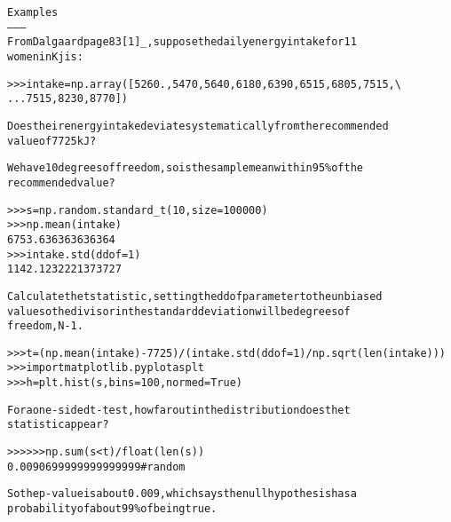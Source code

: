 \begin{boxedminipage}{\funcwidth}
\begin{alltt}
Examples
--------
From Dalgaard page 83 [1]\_, suppose the daily energy intake for 11
women in Kj is:

{\textgreater}{\textgreater}{\textgreater} intake = np.array([5260., 5470, 5640, 6180, 6390, 6515, 6805, 7515, {\textbackslash}
...                    7515, 8230, 8770])

Does their energy intake deviate systematically from the recommended
value of 7725 kJ?

We have 10 degrees of freedom, so is the sample mean within 95\% of the
recommended value?

{\textgreater}{\textgreater}{\textgreater} s = np.random.standard\_t(10, size=100000)
{\textgreater}{\textgreater}{\textgreater} np.mean(intake)
6753.636363636364
{\textgreater}{\textgreater}{\textgreater} intake.std(ddof=1)
1142.1232221373727

Calculate the t statistic, setting the ddof parameter to the unbiased
value so the divisor in the standard deviation will be degrees of
freedom, N-1.

{\textgreater}{\textgreater}{\textgreater} t = (np.mean(intake)-7725)/(intake.std(ddof=1)/np.sqrt(len(intake)))
{\textgreater}{\textgreater}{\textgreater} import matplotlib.pyplot as plt
{\textgreater}{\textgreater}{\textgreater} h = plt.hist(s, bins=100, normed=True)

For a one-sided t-test, how far out in the distribution does the t
statistic appear?

{\textgreater}{\textgreater}{\textgreater} {\textgreater}{\textgreater}{\textgreater} np.sum(s{\textless}t) / float(len(s))
0.0090699999999999999  \#random

So the p-value is about 0.009, which says the null hypothesis has a
probability of about 99\% of being true.
\end{alltt}

\setlength{\parskip}{1ex}
    \end{boxedminipage}

    \label{QSTK:qstklearn:mldiagnostics:triangular}

    \vspace{0.5ex}

